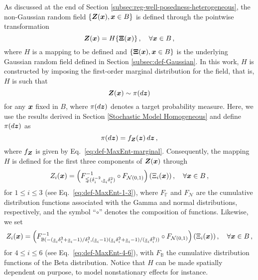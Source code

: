As discussed at the end of Section \ref{subsec:reg-well-posedness-heterogeneous}, the non-Gaussian random field $\{\boldsymbol{Z}(\boldsymbol{x}), \boldsymbol{x} \in B\}$ is defined through the pointwise transformation
\begin{equation}\label{eq:def-push-forward}
    \boldsymbol{Z}(\boldsymbol{x}) = H \{{\bf \Xi}(\boldsymbol{x})\}\,, \quad \forall \boldsymbol{x} \in B\,,
\end{equation}
where $H$ is a mapping to be defined and $\{{\bf \Xi}(\boldsymbol{x}), \boldsymbol{x} \in B\}$ is the underlying Gaussian random field defined in Section \ref{subsec:def-Gaussian}. In this work, $H$ is constructed by imposing the first-order marginal distribution for the field, that is, $H$ is such that
\begin{equation}
    \boldsymbol{Z}(\boldsymbol{x}) \sim \pi(d\boldsymbol{z})
\end{equation}
for any $\boldsymbol{x}$ fixed in $B$, where $\pi(d\boldsymbol{z})$ denotes a target probability measure. Here, we use the results derived in Section \ref{Stochastic Model Homogeneous} and define $\pi(d\boldsymbol{z})$ as
\begin{equation}
    \pi(d\boldsymbol{z}) = f_{\boldsymbol{Z}}(\boldsymbol{z})\,d\boldsymbol{z}\,,
\end{equation}
where $f_{\boldsymbol{Z}}$ is given by Eq.~\eqref{eq:def-MaxEnt-marginal}. Consequently, the mapping $H$ is defined for the first three components of $\boldsymbol{Z}(\boldsymbol{x})$ through
\begin{equation}
    Z_i(\boldsymbol{x}) = \left( F_{\mathbb{\Gamma}(\delta_i^{-2}, \underline{z}_i \delta_i^{2})}^{-1} \circ F_{\mathcal{N}(0,1)} \right)(\Xi_i(\boldsymbol{x}))\,, \quad \forall \boldsymbol{x} \in B\,,
\end{equation}
for $1 \leq i \leq 3$ (see Eq.~\eqref{eq:def-MaxEnt-1-3}), where $F_{\mathbb{\Gamma}}$ and $F_{\mathcal{N}}$ are the cumulative distribution functions associated with the Gamma and normal distributions, respectively, and the symbol ``$\circ$'' denotes the composition of functions. Likewise, we set
\begin{equation}
    Z_i(\boldsymbol{x}) = \left( F_{\mathbb{B}(-(\underline{z}_i\delta_i^2 + \underline{z}_i - 1)/\delta_i^2, (\underline{z}_i - 1)(\underline{z}_i\delta_i^2 + \underline{z}_i - 1)/(\underline{z}_i \delta_i^2))}^{-1} \circ F_{\mathcal{N}(0,1)} \right)(\Xi_i(\boldsymbol{x}))\,, \quad \forall \boldsymbol{x} \in B\,,
\end{equation}
for $4 \leq i \leq 6$ (see Eq.~\eqref{eq:def-MaxEnt-4-6}), with $F_{\mathbb{B}}$ the cumulative distribution functions of the Beta distribution. Notice that $H$ can be made spatially dependent on purpose, to model nonstationary effects for instance. 

